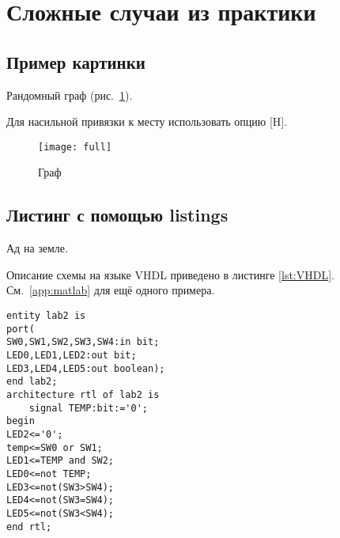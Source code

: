 \section{Сложные случаи из практики}

\subsection{Пример картинки}

Рандомный граф (рис.~\ref{pic:graph}). 

Для насильной привязки к месту использовать опцию [H].

\begin{figure}[ht]
	\centering
	\texttt{[image: full]}
	\caption{Граф}
	\label{pic:graph}
\end{figure}

\subsection{Листинг с помощью listings}

Ад на земле.


Описание схемы на языке VHDL приведено в листинге \ref{lst:VHDL}.
См.~\ref{app:matlab} для ещё одного примера.

\begin{lstlisting}[label=lst:VHDL,caption=Описание схемы]
entity lab2 is
port(
SW0,SW1,SW2,SW3,SW4:in bit;
LED0,LED1,LED2:out bit;
LED3,LED4,LED5:out boolean);
end lab2;
architecture rtl of lab2 is
	signal TEMP:bit:='0';
begin
LED2<='0';
temp<=SW0 or SW1;
LED1<=TEMP and SW2;
LED0<=not TEMP;
LED3<=not(SW3>SW4);
LED4<=not(SW3=SW4);
LED5<=not(SW3<SW4);
end rtl;
\end{lstlisting}

